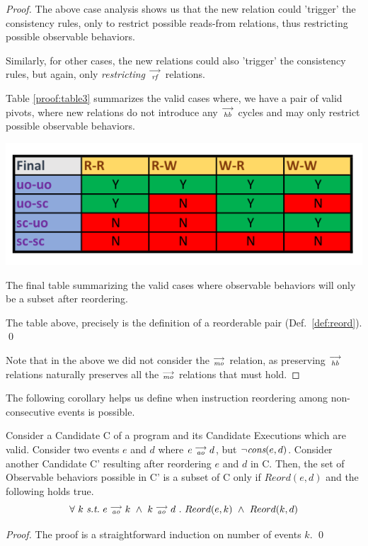 \begin{proof}
        The above case analysis shows us that the new relation could 'trigger' the consistency rules, only to restrict possible reads-from relations, thus restricting possible observable behaviors. 
       
        Similarly, for other cases, the new relations could also 'trigger' the consistency rules, but again, only  \emph{restricting} $\stackrel{\longrightarrow}{_\textit{rf}}$ relations. 

        Table \ref{proof:table3} summarizes the valid cases where, we have a pair of valid pivots, where new relations do not introduce any $\stackrel{\longrightarrow}{_\textit{hb}}$ cycles and may only restrict possible observable behaviors. 
        \begin{table}[H]
            \centering
            \includegraphics[scale=0.7]{Table4_Final.pdf}
            \caption{The final table summarizing the valid cases where observable behaviors will only be a subset after reordering.}
            \label{proof:table3}
        \end{table}
    
        The table above, precisely is the definition of a reorderable pair (Def.~\ref{def:reord}). \qed
                
        
        \vspace{1mm}Note that in the above we did not consider the $\stackrel{\longrightarrow}{_\textit{mo}}$ relation, as preserving $\stackrel{\longrightarrow}{_\textit{hb}}$ relations naturally preserves all the $\stackrel{\longrightarrow}{_\textit{mo}}$ relations that must hold.
\end{proof}

    The following corollary helps us define when instruction reordering among non-consecutive events is possible.
  
\begin{corollary}
    Consider a Candidate C of a program and its Candidate Executions which are valid. Consider two events $e$ and $d$ where $e\stackrel{\longrightarrow}{_{\textit{ao}}}d$, but $\neg \textit{cons}(e,d)$. Consider another Candidate C' resulting after reordering $e$ and $d$ in C. Then, the set of Observable behaviors possible in C' is a subset of C only if $Reord(e,d)$ and the following holds true.
    \[
        \forall \ k \ \textit{s.t.} \ 
        \reln{e}{ao}{k} \ \wedge \ \reln{k}{ao}{d} \ . \ 
        Reord(e,k) \ \wedge \ Reord(k,d)
    \]
    
\end{corollary}
    
\begin{proof}
    The proof is a straightforward induction on number of events $k$. 
    \qed
\end{proof}